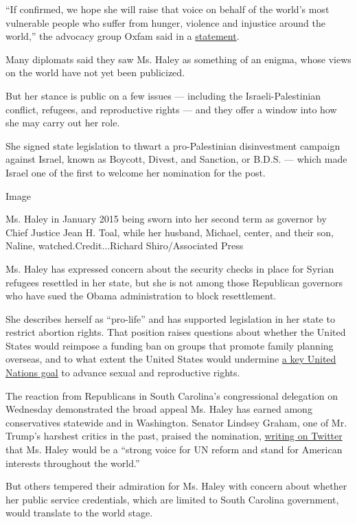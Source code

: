 ``If confirmed, we hope she will raise that voice on behalf of the
world's most vulnerable people who suffer from hunger, violence and
injustice around the world,'' the advocacy group Oxfam said in a
\href{https://www.oxfamamerica.org/press/oxfam-reaction-to-the-appointment-of-governor-nikki-haley-as-the-us-ambassador-to-the-un/}{statement}.

Many diplomats said they saw Ms. Haley as something of an enigma, whose
views on the world have not yet been publicized.

But her stance is public on a few issues --- including the
Israeli-Palestinian conflict, refugees, and reproductive rights --- and
they offer a window into how she may carry out her role.

She signed state legislation to thwart a pro-Palestinian disinvestment
campaign against Israel, known as Boycott, Divest, and Sanction, or
B.D.S. --- which made Israel one of the first to welcome her nomination
for the post.

Image

Ms. Haley in January 2015 being sworn into her second term as governor
by Chief Justice Jean H. Toal, while her husband, Michael, center, and
their son, Naline, watched.Credit...Richard Shiro/Associated Press

Ms. Haley has expressed concern about the security checks in place for
Syrian refugees resettled in her state, but she is not among those
Republican governors who have sued the Obama administration to block
resettlement.

She describes herself as ``pro-life'' and has supported legislation in
her state to restrict abortion rights. That position raises questions
about whether the United States would reimpose a funding ban on groups
that promote family planning overseas, and to what extent the United
States would undermine \href{http://indicators.report/targets/5-6/}{a
key United Nations goal} to advance sexual and reproductive rights.

The reaction from Republicans in South Carolina's congressional
delegation on Wednesday demonstrated the broad appeal Ms. Haley has
earned among conservatives statewide and in Washington. Senator Lindsey
Graham, one of Mr. Trump's harshest critics in the past, praised the
nomination,
\href{https://twitter.com/LindseyGrahamSC/status/801429937509040128}{writing
on Twitter} that Ms. Haley would be a ``strong voice for UN reform and
stand for American interests throughout the world.''

But others tempered their admiration for Ms. Haley with concern about
whether her public service credentials, which are limited to South
Carolina government, would translate to the world stage.

